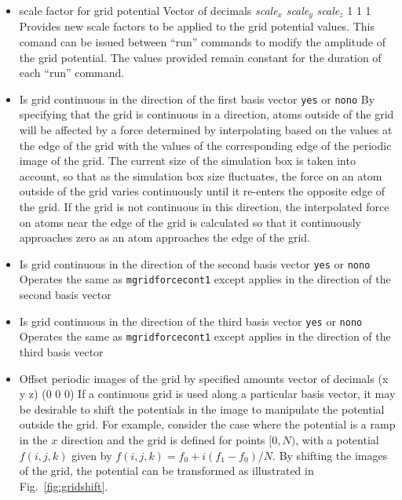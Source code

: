 \begin{itemize}
\item
{}
{scale factor for grid potential}
{Vector of decimals {\it scale}$_x$ {\it scale}$_y$ {\it scale}$_z$ }
{1 1 1}
{Provides new scale factors to be applied to the grid potential values. This comand can be issued between ``run'' commands to modify the amplitude of the grid potential. The values provided remain constant for the duration of each ``run'' command.}


\item
{}
{Is grid continuous in the direction of the first basis vector}
{{\tt yes} or {\tt no}}{{\tt no}}
{By specifying that the grid is continuous in a direction, atoms outside of the grid will be affected by a force determined by interpolating based on the values at the edge of the grid with the values of the corresponding edge of the periodic image of the grid. The current size of the simulation box is taken into account, so that as the simulation box size fluctuates, the force on an atom outside of the grid varies continuously until it re-enters the opposite edge of the grid. If the grid is not continuous in this direction, the interpolated force on atoms near the edge of the grid is calculated so that it continuously approaches zero as an atom approaches the edge of the grid.}

\item
{}
{Is grid continuous in the direction of the second basis vector}
{{\tt yes} or {\tt no}}{{\tt no}}
{Operates the same as {\tt mgridforcecont1} except applies in the direction of the second basis vector}

\item
{}
{Is grid continuous in the direction of the third basis vector}
{{\tt yes} or {\tt no}}{{\tt no}}
{Operates the same as {\tt mgridforcecont1} except applies in the direction of the third basis vector}

\item
{}
{Offset periodic images of the grid by specified amounts}
{vector of decimals (x y z)}
{(0 0 0)}
{If a continuous grid is used along a particular basis vector, it may be desirable to shift the potentials in the image to manipulate the potential outside the grid. For example, consider the case where the potential is a ramp in the $x$ direction and the grid is defined for points $[0,N)$, with a potential $f(i,j,k)$ given by $f(i,j,k) = f_0 + i (f_1-f_0) / N$. By shifting the images of the grid, the potential can be transformed as illustrated in Fig.~\ref{fig:gridshift}.
}


\end{itemize}

